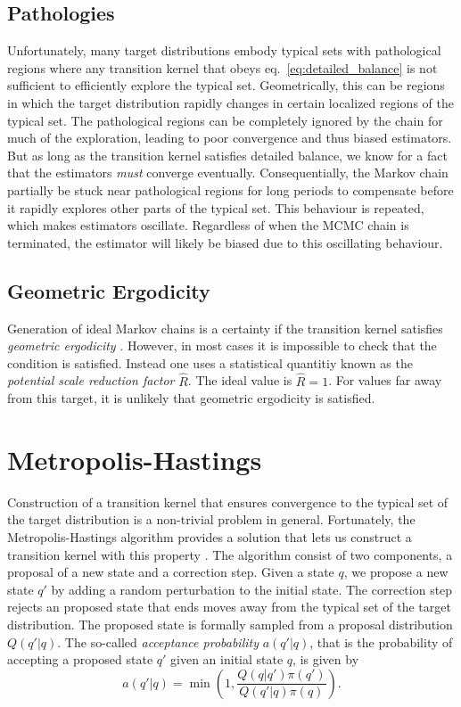 \subsection{Pathologies}
Unfortunately, many target distributions embody typical sets with pathological regions where any 
transition kernel that obeys eq.~\eqref{eq:detailed_balance} is not sufficient to efficiently explore the typical set.
Geometrically, this can be regions in which the target distribution rapidly changes in certain localized regions of
the typical set.
The pathological regions can be completely ignored by the chain for much of the exploration,
leading to poor convergence and thus biased estimators. But as long as the transition kernel
satisfies detailed balance, we know for a fact that the estimators \textit{must} converge eventually.
Consequentially, the Markov chain partially be stuck near pathological regions for long periods to compensate
before it rapidly explores other parts of the typical set. This behaviour is repeated, 
which makes estimators oscillate. Regardless of when the MCMC chain is terminated, the estimator will likely be biased due
to this oscillating behaviour.

\subsection{Geometric Ergodicity}
Generation of ideal Markov chains is a certainty if the transition kernel satisfies \textit{geometric ergodicity} \cite{geometric_ergodicity}.
However, in most cases it is impossible to check that the condition is satisfied. Instead one uses a statistical quantitiy known
as the \textit{potential scale reduction factor} $\hat{R}$. The ideal value is $\hat{R} = 1$. For values far away from this target,
it is unlikely that geometric ergodicity is satisfied.



\section{Metropolis-Hastings}
Construction of a transition kernel that ensures convergence to the typical set of the target distribution is a non-trivial problem in general.
Fortunately, the Metropolis-Hastings algorithm provides a solution that lets us construct 
a transition kernel with this property \cite{metropolis,metropolis_two}. 
The algorithm consist of two components, a proposal of a new state and a correction step.
Given a state $q$, we propose a new state $q'$ by adding a random perturbation to the initial state.
The correction step rejects an proposed state that ends moves away from the typical set of the target distribution.
The proposed state is formally sampled from a proposal distribution $Q(q'|q)$. The so-called \textit{acceptance probability} $a(q'| q)$, 
that is the probability of accepting a proposed state $q'$ given an initial state $q$, is given by
\begin{equation}\label{eq:general_acceptance_prob}
    a(q'|q) = \min \left(1, \frac{Q(q|q')\pi(q')}{Q(q'|q)\pi (q)}\right).
\end{equation}

